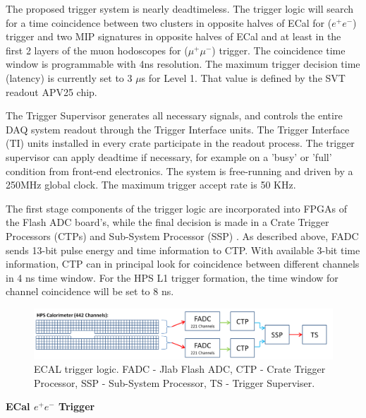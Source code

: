 


The proposed trigger system is nearly deadtimeless. 
 The trigger logic will search for a time coincidence between two clusters in opposite halves of ECal for ($e^+e^-$) trigger and two MIP signatures in opposite halves of ECal and at least in the first 2 layers of the muon hodoscopes for ($\mu^+\mu^-$) trigger. The coincidence time window is programmable with 4ns resolution. The maximum trigger decision time (latency) is currently set to 3 $\mu$s for Level 1. That value is defined by the SVT readout APV25 chip.

The Trigger Supervisor generates all necessary signals, and controls the entire DAQ system readout through the Trigger Interface units. The Trigger Interface (TI) units installed in every crate participate in the readout process. The trigger supervisor can apply deadtime if necessary, for example on a 'busy' or 'full' condition from front-end electronics. The system is free-running and driven by a 250MHz global clock. The maximum trigger accept rate is 50 KHz.

The first stage components of the trigger logic are incorporated into FPGAs of the Flash ADC board's, while the final decision is made in a Crate Trigger Processors (CTPs) and  Sub-System Processor (SSP) . As described above, 
FADC sends 13-bit pulse energy and time information to CTP. With available 3-bit time information, CTP can in principal look for coincidence between different channels in 4 ns time window. For the HPS L1 trigger formation, the time window for channel coincidence will be set to 8 ns.

\begin{figure}[t]
\includegraphics[scale=0.25]{daq_trigger/figures/hps_trigger_cal}
\caption{\small{ECAL trigger logic. FADC - Jlab Flash ADC, CTP - Crate Trigger Processor, SSP - Sub-System Processor, TS - Trigger Superviser.}}
\label{fig:hps_trigger_cal}
\end{figure}

{\bf ECal $e^+e^-$ Trigger} 

